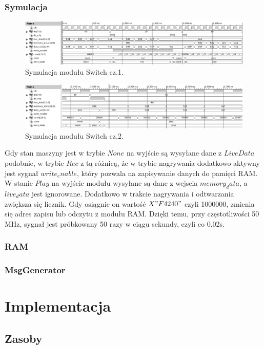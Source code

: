 \documentclass[a4paper,11pt]{article}
\begin{document}
\subsubsection*{Symulacja}
\begin{figure}[H]
\center
\includegraphics[scale=0.6]{switchsym1bw.png}
\caption{Symulacja modułu Switch cz.1.}
\end{figure}

\begin{figure}[H]
\center
\includegraphics[scale=0.6]{switchsym2bw.png}
\caption{Symulacja modułu Switch cz.2.}
\end{figure}

Gdy stan maszyny jest w trybie $None$ na wyjście są wysyłane dane z $LiveData$ podobnie, w trybie $Rec$ z tą różnicą, że w trybie nagrywania dodatkowo aktywny jest sygnał $write_enable$, który pozwala na zapisywanie danych do pamięci RAM. W stanie $Play$ na wyjście modułu wysyłane są dane z wejscia $memory_data$, a $live_data$ jest ignorowane. Dodatkowo w trakcie nagrywania i odtwarzania zwiększa się licznik. Gdy osiągnie on wartość $X"F4240"$ czyli 1000000, zmienia się adres zapisu lub odczytu z modułu RAM. Dzięki temu, przy częstotliwości 50 MHz, sygnał jest próbkowany 50 razy w ciągu sekundy, czyli co 0,02s.

\subsubsection{RAM}

\subsubsection{MsgGenerator}

\section{Implementacja}
\subsection{Zasoby}
\end{document}
